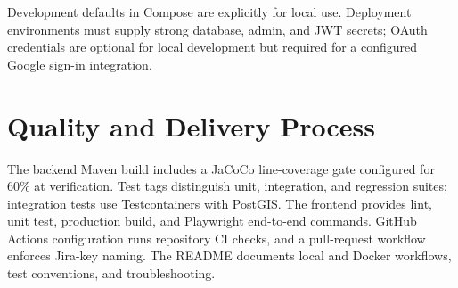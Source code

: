 \documentclass[11pt,a4paper]{article}
\begin{document}
Development defaults in Compose are explicitly for local use. Deployment environments must supply strong database, admin, and JWT secrets; OAuth credentials are optional for local development but required for a configured Google sign-in integration.

\section{Quality and Delivery Process}
The backend Maven build includes a JaCoCo line-coverage gate configured for 60\% at verification. Test tags distinguish unit, integration, and regression suites; integration tests use Testcontainers with PostGIS. The frontend provides lint, unit test, production build, and Playwright end-to-end commands. GitHub Actions configuration runs repository CI checks, and a pull-request workflow enforces Jira-key naming. The README documents local and Docker workflows, test conventions, and troubleshooting.
\end{document}
